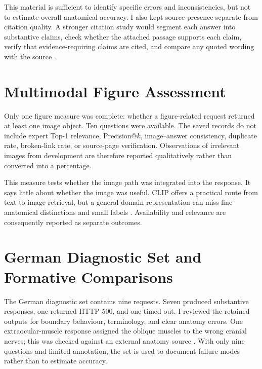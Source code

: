 This material is sufficient to identify specific errors and inconsistencies, but not to estimate overall anatomical accuracy. I also kept source presence separate from citation quality. A stronger citation study would segment each answer into substantive claims, check whether the attached passage supports each claim, verify that evidence-requiring claims are cited, and compare any quoted wording with the source \parencite{gao2023alce}.

\section{Multimodal Figure Assessment}
\label{sec:image-evaluation-method}

Only one figure measure was complete: whether a figure-related request returned at least one image object. Ten questions were available. The saved records do not include expert Top-1 relevance, Precision@$k$, image--answer consistency, duplicate rate, broken-link rate, or source-page verification. Observations of irrelevant images from development are therefore reported qualitatively rather than converted into a percentage.

This measure tests whether the image path was integrated into the response. It says little about whether the image was useful. CLIP offers a practical route from text to image retrieval, but a general-domain representation can miss fine anatomical distinctions and small labels \parencite{radford2021,wang2022medclip}. Availability and relevance are consequently reported as separate outcomes.

\section{German Diagnostic Set and Formative Comparisons}
\label{sec:diagnostic-method}

The German diagnostic set contains nine requests. Seven produced substantive responses, one returned HTTP 500, and one timed out. I reviewed the retained outputs for boundary behaviour, terminology, and clear anatomy errors. One extraocular-muscle response assigned the oblique muscles to the wrong cranial nerves; this was checked against an external anatomy source \parencite{purves2001extraocular}. With only nine questions and limited annotation, the set is used to document failure modes rather than to estimate accuracy.

